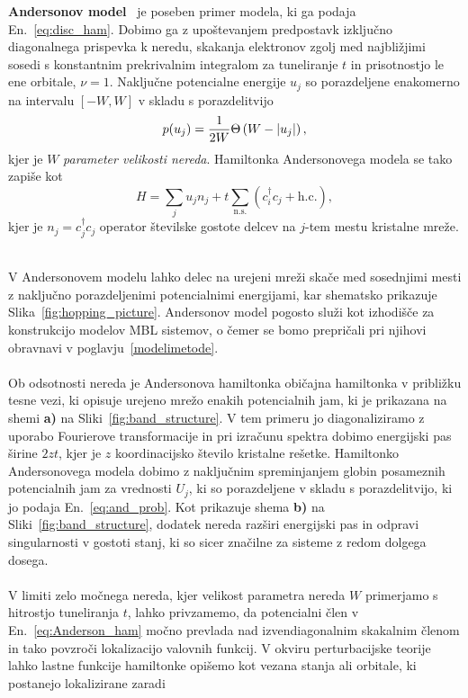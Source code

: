 \textbf{Andersonov model}~\cite{anderson1958absence} je poseben primer modela, ki ga podaja En.~\eqref{eq:disc_ham}. Dobimo ga z upoštevanjem predpostavk izključno diagonalnega prispevka k neredu, skakanja elektronov zgolj med najbližjimi sosedi s konstantnim prekrivalnim integralom za tuneliranje $t$ in prisotnostjo le ene orbitale, $\nu=1$. Naključne potencialne energije $u_j$ so porazdeljene enakomerno na intervalu $\left[-W,W\right]$ v skladu s porazdelitvijo
\begin{equation}\label{eq:and_prob}
p(u_j)= \frac{1}{2W}\Theta \left(W - \left| u_j \right| \right),
\end{equation}
kjer je $W$ \emph{parameter velikosti nereda}. Hamiltonka Andersonovega modela se tako zapiše kot 
\begin{equation}\label{eq:Anderson_ham}
H=\sum\limits_j u_j n_j + t\sum\limits_{\mathrm{n. s.}}\left(c^\dagger_i c_j + \mathrm{h.c.}\right),
\end{equation}
kjer je $n_j=c^\dagger_jc_j$ operator številske gostote delcev na $j$-tem mestu kristalne mreže.\\\\
\begin{minipage}[t]{0.55\textwidth}
V Andersonovem modelu lahko delec na urejeni mreži skače med sosednjimi mesti z naključno porazdeljenimi potencialnimi energijami, kar shematsko prikazuje Slika~\ref{fig:hopping_picture}. Andersonov model pogosto služi kot izhodišče za konstrukcijo modelov MBL sistemov, o čemer se bomo prepričali pri njihovi obravnavi v poglavju~\ref{modelimetode}.\\\\
Ob odsotnosti nereda je Andersonova hamiltonka običajna hamiltonka v približku tesne vezi, ki opisuje urejeno mrežo enakih potencialnih jam, ki je prikazana na shemi \textbf{a)} na Sliki~\ref{fig:band_structure}.  V tem primeru jo diagonaliziramo z uporabo Fourierove transformacije in pri izračunu spektra dobimo energijski pas širine $2zt$, kjer je $z$ koordinacijsko število kristalne rešetke. Hamiltonko Andersonovega modela dobimo z naključnim spreminjanjem globin posameznih potencialnih jam za vrednosti $U_j$, ki so porazdeljene v skladu s porazdelitvijo, ki jo podaja En.~\eqref{eq:and_prob}. Kot prikazuje shema \textbf{b)} na Sliki~\ref{fig:band_structure}, dodatek nereda razširi energijski pas in odpravi singularnosti v gostoti stanj, ki so sicer značilne za sisteme z redom dolgega dosega. \\\\
V limiti zelo močnega nereda, kjer velikost parametra nereda $W$ primerjamo s hitrostjo tuneliranja $t$, lahko privzamemo, da potencialni člen v En.~\eqref{eq:Anderson_ham} močno prevlada nad izvendiagonalnim skakalnim členom in tako povzroči lokalizacijo valovnih funkcij. V okviru perturbacijske teorije lahko lastne funkcije hamiltonke opišemo kot vezana stanja ali orbitale, ki postanejo lokalizirane zaradi 
\end{minipage}\hfill
